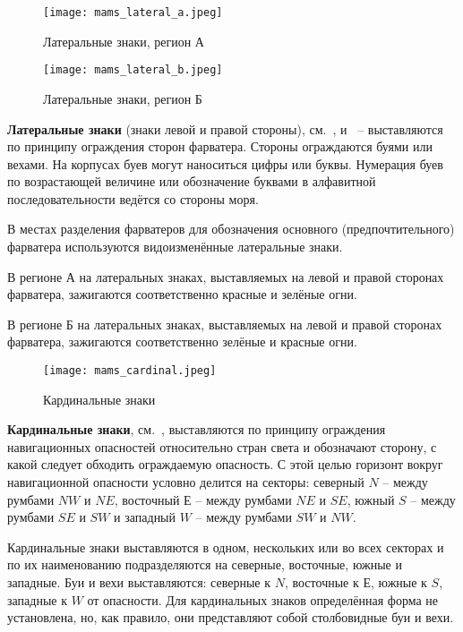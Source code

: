 \begin{figure}[htb]
  \centering{}
  \texttt{[image: mams\_lateral\_a.jpeg]}
  \caption{Латеральные знаки, регион А}
  \label{fig:mams-lateral-a}
\end{figure}

\begin{figure}[htb]
  \centering{}
  \texttt{[image: mams\_lateral\_b.jpeg]}
  \caption{Латеральные знаки, регион Б}
  \label{fig:mams-lateral-b}
\end{figure}

\textbf{Латеральные знаки} (знаки левой и
правой стороны), см.~, 
и~ \--- выставляются по принципу ограждения
сторон фарватера.  Стороны ограждаются буями или вехами. На корпусах
буев могут наноситься цифры или буквы. Нумерация буев по возрастающей
величине или обозначение буквами в алфавитной последовательности
ведётся со стороны моря.

В местах разделения фарватеров для обозначения основного
(предпочтительного) фарватера используются видоизменённые латеральные
знаки.

В регионе А на латеральных знаках, выставляемых на левой и правой
сторонах фарватера, зажигаются соответственно красные и зелёные огни.

В регионе Б на латеральных знаках, выставляемых на левой и правой
сторонах фарватера, зажигаются соответственно зелёные и красные огни.

\begin{figure}[htb]
  \centering{}
  \texttt{[image: mams\_cardinal.jpeg]}
  \caption{Кардинальные знаки}
  \label{fig:mams-cardinal}
\end{figure}

\textbf{Кардинальные знаки},
см.~, выставляются по принципу ограждения
навигационных опасностей относительно стран света и обозначают
сторону, с какой следует обходить ограждаемую опасность. С этой целью
горизонт вокруг навигационной опасности условно делится на секторы:
северный $N$ \--- между румбами $NW$ и $NE$, восточный $Е$ \--- между румбами
$NE$ и $SE$, южный $S$ \--- между румбами $SE$ и $SW$ и западный $W$ \--- между
румбами $SW$ и $NW$.

Кардинальные знаки выставляются в одном, нескольких или во всех
секторах и по их наименованию подразделяются на северные, восточные,
южные и западные. Буи и вехи выставляются: северные к $N$, восточные к
$Е$, южные к $S$, западные к $W$ от опасности.  Для кардинальных знаков
определённая форма не установлена, но, как правило, они представляют
собой столбовидные буи и вехи.

